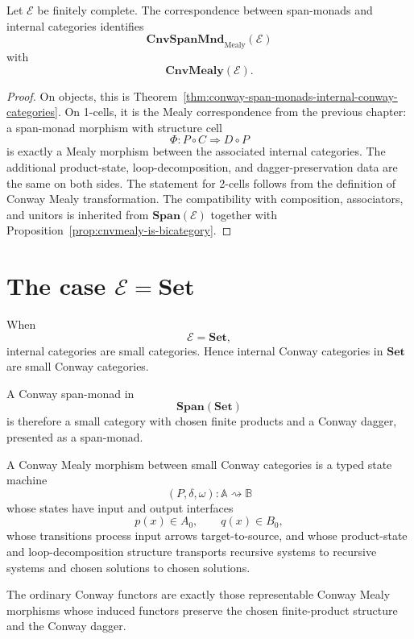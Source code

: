 \begin{theorem}
\label{thm:span-monadic-conway-mealy-calculus}
Let \(\mathcal E\) be finitely complete.  The correspondence between
span-monads and internal categories identifies
\[
\mathbf{CnvSpanMnd}_{\mathrm{Mealy}}(\mathcal E)
\]
with
\[
\mathbf{CnvMealy}(\mathcal E).
\]
\end{theorem}

\begin{proof}
On objects, this is
Theorem~\ref{thm:conway-span-monads-internal-conway-categories}.  On 1-cells,
it is the Mealy correspondence from the previous chapter: a span-monad
morphism with structure cell
\[
\Phi:P\circ C\Rightarrow D\circ P
\]
is exactly a Mealy morphism between the associated internal categories.
The additional product-state, loop-decomposition, and dagger-preservation
data are the same on both sides.  The statement for 2-cells follows from the
definition of Conway Mealy transformation.  The compatibility with
composition, associators, and unitors is inherited from
\(\mathbf{Span}(\mathcal E)\) together with
Proposition~\ref{prop:cnvmealy-is-bicategory}.
\end{proof}

\section{The case \(\mathcal E=\mathbf{Set}\)}
\label{sec:conway-set-case}

When
\[
\mathcal E=\mathbf{Set},
\]
internal categories are small categories.  Hence internal Conway categories in
\(\mathbf{Set}\) are small Conway categories.

A Conway span-monad in
\[
\mathbf{Span}(\mathbf{Set})
\]
is therefore a small category with chosen finite products and a Conway dagger,
presented as a span-monad.

A Conway Mealy morphism between small Conway categories is a typed state
machine
\[
(P,\delta,\omega):\mathbb A\rightsquigarrow\mathbb B
\]
whose states have input and output interfaces
\[
p(x)\in A_0,
\qquad
q(x)\in B_0,
\]
whose transitions process input arrows target-to-source, and whose
product-state and loop-decomposition structure transports recursive systems
to recursive systems and chosen solutions to chosen solutions.

The ordinary Conway functors are exactly those representable Conway Mealy
morphisms whose induced functors preserve the chosen finite-product structure
and the Conway dagger.

